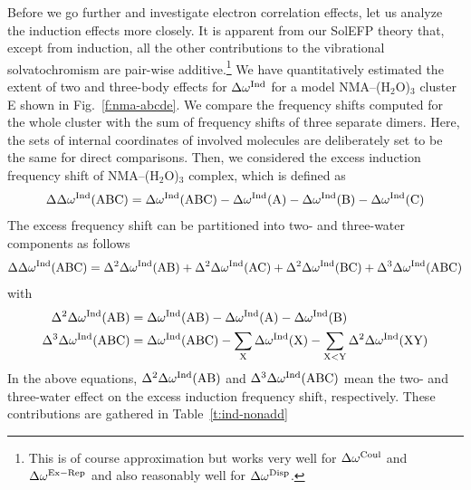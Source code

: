 \documentclass[a4paper,titlepage,twoside,fleqn,12pt]{book}
\begin{document}
\begin{refsection}
Before we go further and investigate electron correlation
effects, let us analyze the induction effects more closely.
It is apparent from our SolEFP theory that, except from induction, 
all the other contributions to the vibrational solvatochromism
are pair\hyp{}wise additive.\footnote{This is of course approximation
but works very well for $\Delta\omega^{\rm Coul}$ and $\Delta\omega^{\rm Ex-Rep}$
and also reasonably well for $\Delta\omega^{\rm Disp}$.} 
We have quantitatively estimated
the extent of two and three\hyp{}body effects for $\Delta\omega^{\rm Ind}$
for a model NMA--(H$_2$O)$_3$ cluster E shown in Fig.~\ref{f:nma-abcde}. 
We compare the frequency shifts computed for the whole cluster 
with the sum of frequency shifts of three
separate dimers. Here, the sets of internal coordinates of
involved molecules are deliberately set to be the same for
direct comparisons. Then, we considered the excess induction
frequency shift of NMA--(H$_2$O)$_3$
complex, which is defined as
%
\begin{equation}
\Delta\Delta\omega^{\rm Ind}(\text{ABC}) = \Delta\omega^{\rm Ind}(\text{ABC})
 - \Delta\omega^{\rm Ind}(\text{A}) - \Delta\omega^{\rm Ind}(\text{B}) - \Delta\omega^{\rm Ind}(\text{C})
\end{equation}
%
The excess frequency shift can be partitioned into two\hyp{} and three\hyp{}water components as follows 
%
\begin{equation}
\Delta\Delta\omega^{\rm Ind}(\text{ABC}) = 
\Delta^2\Delta\omega^{\rm Ind}(\text{AB}) +
\Delta^2\Delta\omega^{\rm Ind}(\text{AC}) +
\Delta^2\Delta\omega^{\rm Ind}(\text{BC}) +
\Delta^3\Delta\omega^{\rm Ind}(\text{ABC})
\end{equation}
%
with
%
\begin{subequations}
\begin{align}
\Delta^2\Delta\omega^{\rm Ind}(\text{AB}) &= 
   \Delta\omega^{\rm Ind}(\text{AB}) - 
   \Delta\omega^{\rm Ind}(\text{A})  -
   \Delta\omega^{\rm Ind}(\text{B}) \\
\Delta^3\Delta\omega^{\rm Ind}(\text{ABC})&=
   \Delta\omega^{\rm Ind}(\text{ABC}) -
\sum_\text{X} \Delta\omega^{\rm Ind}(\text{X}) -
\sum_{\text{X}<\text{Y}} \Delta^2\Delta\omega^{\rm Ind}(\text{XY})
\end{align}
\end{subequations}
%
In the above equations, $\Delta^2\Delta\omega^{\rm Ind}(\text{AB})$
and $\Delta^3\Delta\omega^{\rm Ind}(\text{ABC})$
mean the two\hyp{} and three\hyp{}water effect on the excess induction frequency shift,
respectively. These contributions are gathered in Table~\ref{t:ind-nonadd}

\end{refsection}
\end{document}

